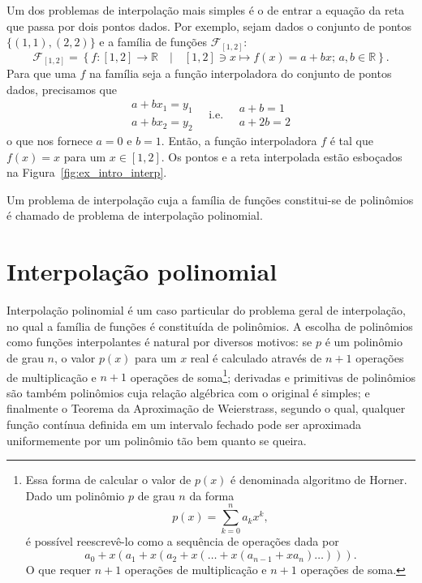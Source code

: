 \begin{ex}\label{ex:intro_interpolacao}
  Um dos problemas de interpolação mais simples é o de entrar a equação da reta que passa por dois pontos dados. Por exemplo, sejam dados o conjunto de pontos $\{(1, 1), (2, 2)\}$ e a família de funções $\mathcal{F}_{[1,2]}$:
  \begin{equation*}
   \mathcal{F}_{[1,2]} = \left\{f:[1,2]\rightarrow \mathbb{R}\quad|\quad[1,2]\ni x\mapsto f(x) = a + bx;\,a,b\in\mathbb{R}\right\}.
  \end{equation*}
  Para que uma $f$ na família seja a função interpoladora do conjunto de pontos dados, precisamos que
  \begin{equation*}
    \begin{array}{l}
      a + bx_1 = y_1\\
      a + bx_2 = y_2
    \end{array}\quad\text{i.e.}\quad
    \begin{array}{l}
      a + b = 1\\
      a + 2b = 2
    \end{array}
  \end{equation*}
o que nos fornece $a = 0$ e $b = 1$. Então, a função interpoladora $f$ é tal que  $f(x) = x$ para um $x\in[1,2]$. Os pontos e a reta interpolada estão esboçados na Figura~\ref{fig:ex_intro_interp}.
\end{ex}

Um problema de interpolação cuja a família de funções constitui-se de polinômios é chamado de problema de interpolação polinomial.

\section{Interpolação polinomial}

Interpolação polinomial é um caso particular do problema geral de interpolação, no qual a família de funções é constituída de polinômios. A escolha de polinômios como funções interpolantes é natural por diversos  motivos: se $p$ é um polinômio de grau $n$, o valor $p(x)$ para um $x$ real é calculado através de $n+1$ operações de multiplicação e $n+1$ operações de soma\footnote{Essa forma de calcular o valor de $p(x)$ é denominada algoritmo de Horner. Dado um polinômio $p$ de grau $n$ da forma \begin{equation*}p(x)=\sum_{k=0}^{n}a_k x^k,\end{equation*} é possível reescrevê-lo como a sequência de operações dada por \begin{equation*}a_0 + x\left(a_1 + x\left(a_2 + x\left(\ldots + x\left(a_{n-1} + x a_n\right)\ldots\right)\right)\right).\end{equation*} O que requer $n+1$ operações de multiplicação e $n+1$ operações de soma.}; derivadas e primitivas de polinômios são também polinômios cuja relação algébrica com o original é simples; e finalmente o Teorema da Aproximação de Weierstrass, segundo o qual, qualquer função contínua definida em um intervalo fechado pode ser aproximada uniformemente por um polinômio tão bem quanto se queira.  

